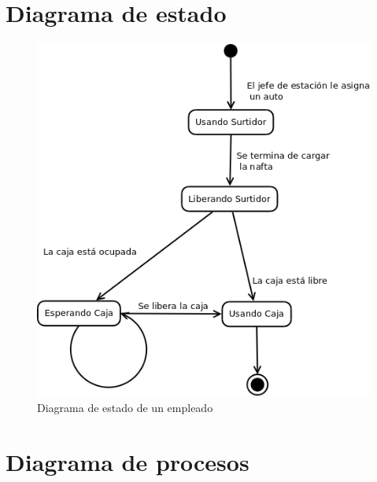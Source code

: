 \documentclass[12pt,a4paper,titlepage,oneside]{article}
\begin{document}
\section{Diagrama de estado}
\begin{figure}[hbtp]
\begin{center}
\includegraphics[scale=0.5]{diagrama_estado_empleado.png}
\end{center}
\caption[Long caption]{Diagrama de estado de un empleado}
\end{figure}

\section{Diagrama de procesos}
\end{document}
